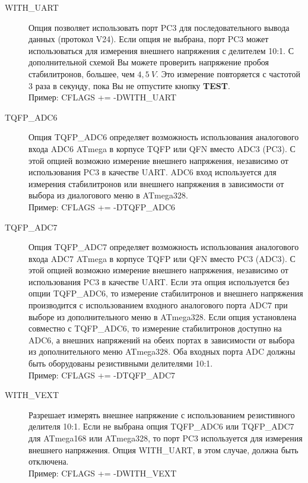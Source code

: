 \begin{description}
  \item[WITH\_UART] Опция позволяет использовать порт PC3 для последовательного вывода данных (протокол V24). 
Если опция не выбрана, порт PC3 может использоваться для измерения внешнего напряжения  с делителем 10:1. 
С дополнительной схемой Вы можете проверить напряжение пробоя стабилитронов, большее, чем \(4,5~V\). 
Это измерение повторяется с частотой 3 раза в секунду, пока Вы не отпустите кнопку \textbf{ TEST}.\\
Пример: CFLAGS += -DWITH\_UART

  \item[TQFP\_ADC6] Опция TQFP\_ADC6 определяет возможность использования аналогового входа ADC6 ATmega в корпусе 
TQFP или QFN вместо ADC3 (PC3).
С этой опцией возможно измерение внешнего напряжения, независимо от использования PC3 в качестве UART.
ADC6 вход используется для измерения стабилитронов или внешнего напряжения в зависимости от выбора из 
диалогового меню в ATmega328.\\
Пример: CFLAGS += -DTQFP\_ADC6

  \item[TQFP\_ADC7] Опция TQFP\_ADC7 определяет возможность использования аналогового входа ADC7 ATmega в корпусе 
TQFP или QFN вместо PC3 (ADC3). С этой опцией возможно измерение внешнего напряжения, независимо от использования 
PC3 в качестве UART. Если эта опция используется без опции TQFP\_ADC6, то измерение стабилитронов и внешнего
напряжения производится с использованием входного аналогового порта ADC7 при выборе из дополнительного меню в 
ATmega328. Если опция установлена совместно с TQFP\_ADC6, то измерение стабилитронов доступно на ADC6, а внешних 
напряжений на обеих портах в зависимости от выбора из дополнительного меню ATmega328. Оба входных порта ADC
должны быть оборудованы резистивными делителями 10:1.\\
Пример: CFLAGS += -DTQFP\_ADC7

  \item[WITH\_VEXT] Разрешает измерять внешнее напряжение с использованием резистивного делителя 10:1.
Если не выбрана опция TQFP\_ADC6 или TQFP\_ADC7 для ATmega168 или ATmega328, то порт PC3 используется для измерения 
внешнего напряжения.
Опция WITH\_UART, в этом случае, должна быть отключена.\\
Пример: CFLAGS += -DWITH\_VEXT


\end{description}
